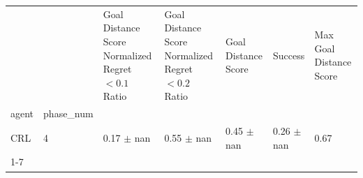 \begin{tabular}{lllllll}
\toprule
 &  & Goal Distance Score Normalized Regret $< 0.1$ Ratio & Goal Distance Score Normalized Regret $< 0.2$ Ratio & Goal Distance Score & Success & Max Goal Distance Score \\
agent & phase_num &  &  &  &  &  \\
\midrule
CRL & 4 & 0.17 $\pm$ nan & 0.55 $\pm$ nan & 0.45 $\pm$ nan & 0.26 $\pm$ nan & 0.67 \\
\cline{1-7}
\bottomrule
\end{tabular}
